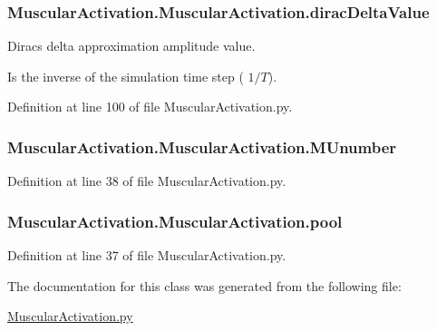 \subsubsection[{\texorpdfstring{dirac\+Delta\+Value}{diracDeltaValue}}]{\setlength{\rightskip}{0pt plus 5cm}Muscular\+Activation.\+Muscular\+Activation.\+dirac\+Delta\+Value}\hypertarget{class_muscular_activation_1_1_muscular_activation_afd716e50c9182ca4676c4b84a0f3dd49}{}\label{class_muscular_activation_1_1_muscular_activation_afd716e50c9182ca4676c4b84a0f3dd49}


Dirac\textquotesingle{}s delta approximation amplitude value. 

Is the inverse of the simulation time step ( $1/T$). 

Definition at line 100 of file Muscular\+Activation.\+py.

\subsubsection[{\texorpdfstring{M\+Unumber}{MUnumber}}]{\setlength{\rightskip}{0pt plus 5cm}Muscular\+Activation.\+Muscular\+Activation.\+M\+Unumber}\hypertarget{class_muscular_activation_1_1_muscular_activation_a1b30292b1cf102fa82bf4a511d151f0b}{}\label{class_muscular_activation_1_1_muscular_activation_a1b30292b1cf102fa82bf4a511d151f0b}


Definition at line 38 of file Muscular\+Activation.\+py.

\subsubsection[{\texorpdfstring{pool}{pool}}]{\setlength{\rightskip}{0pt plus 5cm}Muscular\+Activation.\+Muscular\+Activation.\+pool}\hypertarget{class_muscular_activation_1_1_muscular_activation_aeed87c16618be36ed95f44d38a988f1f}{}\label{class_muscular_activation_1_1_muscular_activation_aeed87c16618be36ed95f44d38a988f1f}


Definition at line 37 of file Muscular\+Activation.\+py.



The documentation for this class was generated from the following file\+:\begin{DoxyCompactItemize}
\item 
\hyperlink{_muscular_activation_8py}{Muscular\+Activation.\+py}\end{DoxyCompactItemize}
